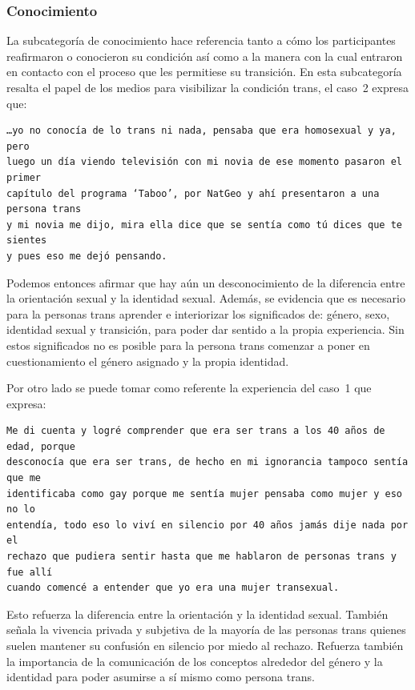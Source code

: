 \subsubsection{Conocimiento}

La subcategoría de conocimiento hace referencia tanto a cómo los participantes
reafirmaron o conocieron su condición así como a la manera con la cual entraron
en contacto con el proceso que les permitiese su transición. En esta
subcategoría resalta el papel de los medios para visibilizar la
condición trans, el caso~2 expresa que:

\begin{verbatim}
…yo no conocía de lo trans ni nada, pensaba que era homosexual y ya, pero
luego un día viendo televisión con mi novia de ese momento pasaron el primer
capítulo del programa ‘Taboo’, por NatGeo y ahí presentaron a una persona trans
y mi novia me dijo, mira ella dice que se sentía como tú dices que te sientes
y pues eso me dejó pensando.
\end{verbatim}

Podemos entonces afirmar que hay aún un desconocimiento de la diferencia entre
la orientación sexual y la identidad sexual. Además, se evidencia que es
necesario para la personas trans aprender e interiorizar los significados de:
género, sexo, identidad sexual y transición, para poder dar sentido a la propia
experiencia. Sin estos significados no es posible para la persona trans comenzar
a poner en cuestionamiento el género asignado y la propia identidad.

Por otro lado se puede tomar como referente la experiencia del caso~1 que
expresa:

\begin{verbatim}
Me di cuenta y logré comprender que era ser trans a los 40 años de edad, porque
desconocía que era ser trans, de hecho en mi ignorancia tampoco sentía que me
identificaba como gay porque me sentía mujer pensaba como mujer y eso no lo
entendía, todo eso lo viví en silencio por 40 años jamás dije nada por el
rechazo que pudiera sentir hasta que me hablaron de personas trans y fue allí
cuando comencé a entender que yo era una mujer transexual.
\end{verbatim}

Esto refuerza la diferencia entre la orientación y la identidad sexual. También
señala la vivencia privada y subjetiva de la mayoría de las personas trans
quienes suelen mantener su confusión en silencio por miedo al rechazo. Refuerza
también la importancia de la comunicación de los conceptos alrededor del género
y la identidad para poder asumirse a sí mismo como persona trans.

